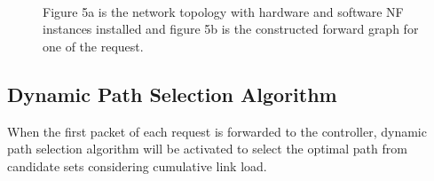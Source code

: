 \documentclass[10pt, conference, letterpaper]{IEEEtran}
\begin{document}

\begin{figure}  
\centering  
{}  
\label{2a}\hfill  
{}  
\label{2b}\\
\caption{Figure 5a is the network topology with hardware and software NF instances installed and figure 5b is the constructed forward graph for one of the request.}  
\label{example}  
\end{figure} 



\subsection{Dynamic Path Selection Algorithm}
When the first packet of each request is forwarded to the controller, dynamic path selection algorithm will be activated to select the optimal path from candidate sets considering cumulative link load.
\end{document}
